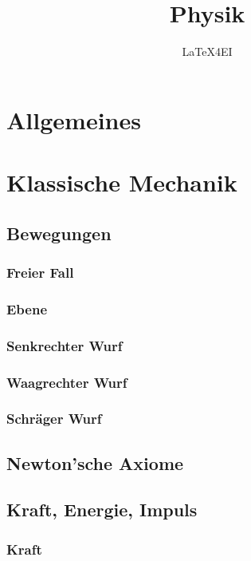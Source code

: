 \documentclass[german]{latex4ei/latex4ei_sheet}
\title{Physik}
\author{LaTeX4EI}                    %
\begin{document}
\maketitle   %


\section{Allgemeines}

\section{Klassische Mechanik}
\subsection{Bewegungen}
\subsubsection{Freier Fall}
\subsubsection{Ebene}
\subsubsection{Senkrechter Wurf}
\subsubsection{Waagrechter Wurf}
\subsubsection{Schräger Wurf}
\subsection{Newton'sche Axiome}
\subsection{Kraft, Energie, Impuls}
\subsubsection{Kraft}
\end{document}
